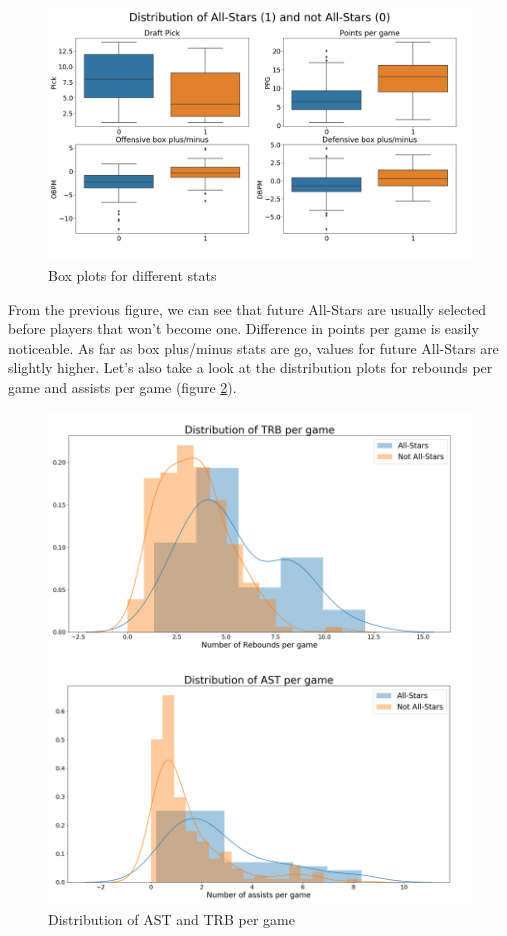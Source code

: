 \documentclass[a4paper]{article}
\begin{document}
\begin{figure}[h!]
\begin{center}
\includegraphics[scale=0.3]{box_plots_all_star.png}
\end{center}
\caption{Box plots for different stats}
\label{plt:box_plots_all_star}
\end{figure}

From the previous figure, we can see that future All-Stars are usually selected before players that won't become one. Difference in points per game is easily noticeable. As far as box plus/minus stats are go, values for future All-Stars are slightly higher. Let's also take a look at the distribution plots for rebounds per game and assists per game (figure \ref{plt:trb_ast_all_star}).

\begin{figure}[h!]
\begin{center}
\includegraphics[scale=0.25]{trb_ast_all_star.png}
\end{center}
\caption{Distribution of AST and TRB per game}
\label{plt:trb_ast_all_star}
\end{figure}
\end{document}
